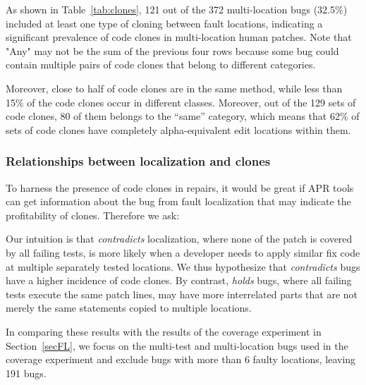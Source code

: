 \documentclass[10pt, conference]{IEEEtran}
\begin{document}
As shown in Table~\ref{tab:clones}, 121 out of the 372 multi-location bugs
(32.5\%) included at least one type of cloning between fault locations,
indicating a significant prevalence of code clones in multi-location human
patches.  Note that "Any" may not be the sum of the previous four rows because
some bug could contain multiple pairs of code clones that belong to different
categories.

Moreover, close to half of code clones are in the same method, while less than
15\% of the code clones occur in different classes. Moreover, out of the 129 sets of code clones,
80 of them belongs to the ``same'' category, which means that 62\% of sets of code clones have completely
alpha-equivalent edit locations within them.

\subsubsection{Relationships between localization and clones}

To harness the presence of code clones in repairs, it would be great if 
APR tools can get information about the bug from fault localization that 
may indicate the profitability of clones. 
Therefore we ask: 


Our intuition is that \emph{contradicts} localization, where none of the patch is 
covered by all failing tests, is more likely when a
developer needs to apply similar fix code at multiple separately tested locations. 
We thus hypothesize that \emph{contradicts} bugs have a higher incidence of code
clones. By contrast, \emph{holds} bugs, where all failing tests execute 
the same patch lines, may have
more interrelated parts that are not merely the same statements copied to
multiple locations.

In comparing these results with the results of the coverage experiment in
Section~\ref{secFL}, we focus on the multi-test and multi-location bugs used in the coverage 
experiment and exclude bugs with more than 6 faulty locations, leaving 191 bugs.
\end{document}
